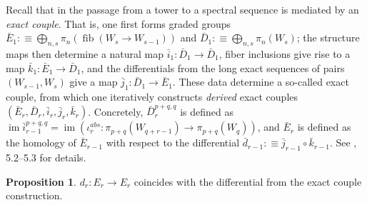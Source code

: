 \documentclass{amsart}
\theoremstyle{definition}
\newtheorem{prp}[theorem]{Proposition}
\newcommand{\fib}{\operatorname{fib}}
\newcommand{\im}{\operatorname{im}}
\begin{document}
Recall that in \cite{Flo} the passage from a tower to a spectral sequence is mediated by an \textit{exact couple}. That is, one first forms graded groups $\bar{E}_1 : \equiv \bigoplus_{n,s}\pi_n(\fib(W_s \to W_{s-1}))$ and $\bar{D}_1 : \equiv \bigoplus_{n,s}\pi_n(W_s)$; the structure maps then determine a natural map $\bar{i}_1: \bar{D}_1 \to \bar{D}_1$, fiber inclusions give rise to a map $\bar{k}_1: \bar{E}_1 \to \bar{D}_1$, and the differentials from the long exact sequences of pairs $(W_{s-1}, W_{s})$ give a map $\bar{j}_1: \bar{D}_1 \to \bar{E}_1$. These data determine a so-called exact couple, from which one iteratively constructs \textit{derived} exact couples $(\bar{E}_r, \bar{D}_r, \bar{i}_r, \bar{j}_r, \bar{k}_r)$. Concretely, $\bar{D}_r^{p+q, q}$ is defined as $\im\bar{i}_{r-1}^{p+q,q} = \im (\iota^{abs}_r: \pi_{p+q}(W_{q+r-1}) \to \pi_{p+q}(W_{q}))$, and $\bar{E}_r$ is defined as the homology of $\bar{E}_{r-1}$ with respect to the differential $\bar{d}_{r-1} : \equiv \bar{j}_{r-1} \circ \bar{k}_{r-1}$. See \cite{Flo}, 5.2--5.3 for details.
\begin{prp}\label{prp:r-cycles}
$d_r : E_r \to E_r$ coincides with the differential from the exact couple construction.
\end{prp}
\end{document}
